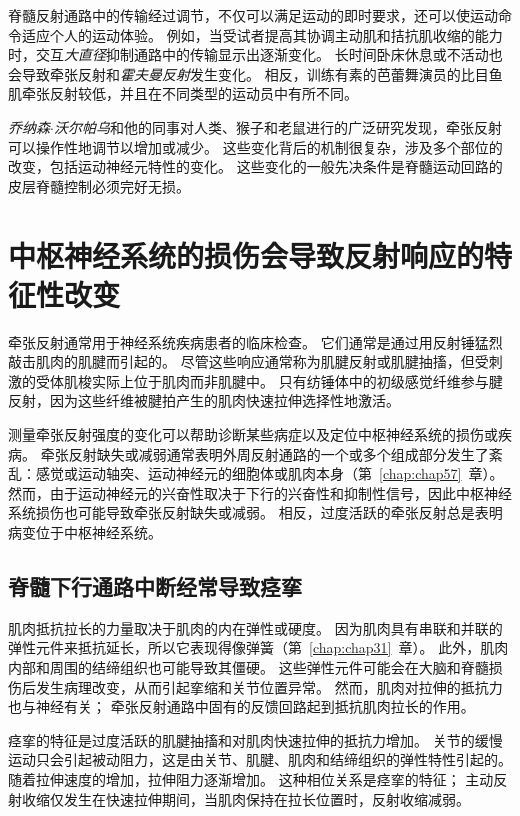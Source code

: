 脊髓反射通路中的传输经过调节，不仅可以满足运动的即时要求，还可以使运动命令适应个人的运动体验。
例如，当受试者提高其协调主动肌和拮抗肌收缩的能力时，交互\textit{大直径}抑制通路中的传输显示出逐渐变化。
长时间卧床休息或不活动也会导致牵张反射和\textit{霍夫曼反射}发生变化。
相反，训练有素的芭蕾舞演员的比目鱼肌牵张反射较低，并且在不同类型的运动员中有所不同。


\textit{乔纳森$\cdot$沃尔帕乌}和他的同事对人类、猴子和老鼠进行的广泛研究发现，牵张反射可以操作性地调节以增加或减少。
这些变化背后的机制很复杂，涉及多个部位的改变，包括运动神经元特性的变化。
这些变化的一般先决条件是脊髓运动回路的皮层脊髓控制必须完好无损。



\section{中枢神经系统的损伤会导致反射响应的特征性改变}

牵张反射通常用于神经系统疾病患者的临床检查。
它们通常是通过用反射锤猛烈敲击肌肉的肌腱而引起的。
尽管这些响应通常称为肌腱反射或肌腱抽搐，但受刺激的受体肌梭实际上位于肌肉而非肌腱中。
只有纺锤体中的初级感觉纤维参与腱反射，因为这些纤维被腱拍产生的肌肉快速拉伸选择性地激活。


测量牵张反射强度的变化可以帮助诊断某些病症以及定位中枢神经系统的损伤或疾病。
牵张反射缺失或减弱通常表明外周反射通路的一个或多个组成部分发生了紊乱：感觉或运动轴突、运动神经元的细胞体或肌肉本身（第~\ref{chap:chap57}~章）。
然而，由于运动神经元的兴奋性取决于下行的兴奋性和抑制性信号，因此中枢神经系统损伤也可能导致牵张反射缺失或减弱。
相反，过度活跃的牵张反射总是表明病变位于中枢神经系统。



\subsection{脊髓下行通路中断经常导致痉挛}

肌肉抵抗拉长的力量取决于肌肉的内在弹性或硬度。
因为肌肉具有串联和并联的弹性元件来抵抗延长，所以它表现得像弹簧（第~\ref{chap:chap31}~章）。
此外，肌肉内部和周围的结缔组织也可能导致其僵硬。
这些弹性元件可能会在大脑和脊髓损伤后发生病理改变，从而引起挛缩和关节位置异常。
然而，肌肉对拉伸的抵抗力也与神经有关；
牵张反射通路中固有的反馈回路起到抵抗肌肉拉长的作用。


痉挛的特征是过度活跃的肌腱抽搐和对肌肉快速拉伸的抵抗力增加。
关节的缓慢运动只会引起被动阻力，这是由关节、肌腱、肌肉和结缔组织的弹性特性引起的。
随着拉伸速度的增加，拉伸阻力逐渐增加。
这种相位关系是痉挛的特征；
主动反射收缩仅发生在快速拉伸期间，当肌肉保持在拉长位置时，反射收缩减弱。


